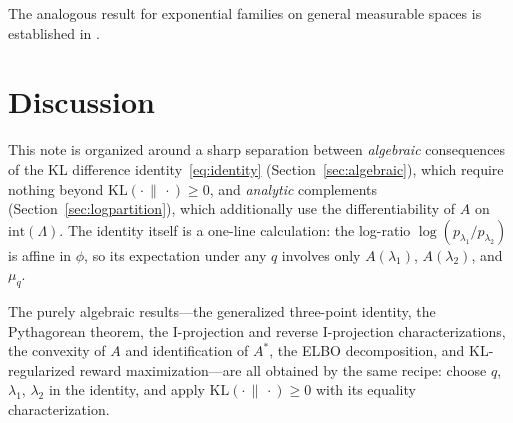 \documentclass[11pt, a4paper, 
onecolumn, 
showabstract]{naverlabseurope-onecol-flex}
\theoremstyle{definition}
\theoremstyle{remark}
\newcommand{\KL}[2]{\mathrm{KL}\!\left(#1 \,\|\, #2\right)}
\begin{document}
The analogous result for exponential families on general measurable spaces is established in \cite[Chapter~3]{Brown1986}.

\section{Discussion}

This note is organized around a sharp separation between \emph{algebraic} consequences of the KL difference identity~\eqref{eq:identity} (Section~\ref{sec:algebraic}), which require nothing beyond $\KL{\cdot}{\cdot} \geq 0$, and \emph{analytic} complements (Section~\ref{sec:logpartition}), which additionally use the differentiability of $A$ on $\mathrm{int}(\Lambda)$.
The identity itself is a one-line calculation: the log-ratio $\log(p_{\lambda_1}/p_{\lambda_2})$ is affine in $\phi$, so its expectation under any $q$ involves only $A(\lambda_1)$, $A(\lambda_2)$, and $\mu_q$.

\smallskip

The purely algebraic results---the generalized three-point identity, the Pythagorean theorem, the I-projection and reverse I-projection characterizations, the convexity of $A$ and identification of $A^*$, the ELBO decomposition, and KL-regularized reward maximization---are all obtained by the same recipe: choose $q$, $\lambda_1$, $\lambda_2$ in the identity, and apply $\KL{\cdot}{\cdot} \geq 0$ with its equality characterization.

\smallskip
\end{document}

